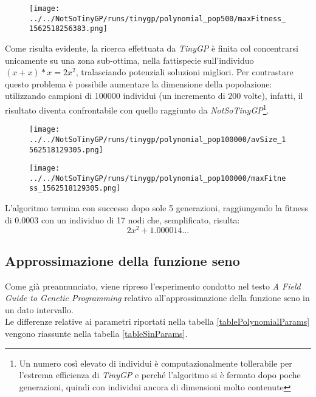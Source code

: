 \documentclass{../llncs}
\newcommand{\labelfig}[1]{\label{fig:#1}}
\begin{document}
\begin{figure}[!htb]
\centering
\texttt{[image: ../../NotSoTinyGP/runs/tinygp/polynomial\_pop500/maxFitness\_1562518256383.png]}
\end{figure}

Come risulta evidente, la ricerca effettuata da \emph{TinyGP} è finita col concentrarsi unicamente su una zona sub-ottima, nella fattispecie sull'individuo $(x+x)*x = 2x^2$, tralasciando potenziali soluzioni migliori. Per contrastare questo problema è possibile aumentare la dimensione della popolazione: utilizzando campioni di 100000 individui (un incremento di 200 volte), infatti, il risultato diventa confrontabile con quello raggiunto da \emph{NotSoTinyGP}\footnote{Un numero così elevato di individui è computazionalmente tollerabile per l'estrema efficienza di \emph{TinyGP} e perché l'algoritmo si è fermato dopo poche generazioni, quindi con individui ancora di dimensioni molto contenute}.\\

\begin{figure}[!htb]
\centering
\texttt{[image: ../../NotSoTinyGP/runs/tinygp/polynomial\_pop100000/avSize\_1562518129305.png]}
\end{figure}

\begin{figure}[!htb]
\centering
\texttt{[image: ../../NotSoTinyGP/runs/tinygp/polynomial\_pop100000/maxFitness\_1562518129305.png]}
\end{figure}

L'algoritmo termina con successo dopo sole 5 generazioni, raggiungendo la fitness di $0.0003$ con un individuo di 17 nodi che, semplificato, risulta:
\[
2x^2+1.000014\ldots
\]

\subsection{Approssimazione della funzione seno}
Come già preannunciato, viene ripreso l'esperimento condotto nel testo \emph{A Field Guide to Genetic Programming} relativo all'approssimazione della funzione seno in un dato intervallo.\\

Le differenze relative ai parametri riportati nella tabella \ref{tablePolynomialParams} vengono riassunte nella tabella \ref{tableSinParams}.
\end{document}
